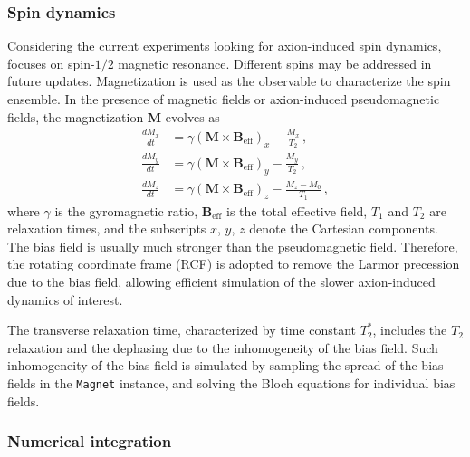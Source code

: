 \documentclass[universe,article,submit,oneauthor]{Definitions/mdpi}
\begin{document}
\subsubsection{Spin dynamics}
\label{sec:spindynamics}

Considering the current experiments looking for axion-induced spin dynamics, \axionbloch{} focuses on spin-$1/2$ magnetic resonance. 
Different spins may be addressed in future updates. 
Magnetization is used as the observable to characterize the spin ensemble. 
In the presence of magnetic fields or axion-induced pseudomagnetic fields, the magnetization $\mathbf{M}$ evolves as
\begin{align}
\frac{d M_x}{dt} &= \gamma \left( \mathbf{M} \times \mathbf{B}_{\mathrm{eff}} \right)_x - \frac{M_x}{T_2}\,,\label{eq:bloch_x} \\
\frac{d M_y}{dt} &= \gamma \left( \mathbf{M} \times \mathbf{B}_{\mathrm{eff}} \right)_y - \frac{M_y}{T_2}\,,\label{eq:bloch_y} \\
\frac{d M_z}{dt} &= \gamma \left( \mathbf{M} \times \mathbf{B}_{\mathrm{eff}} \right)_z - \frac{M_z - M_0}{T_1}\,,\label{eq:bloch_z}
\end{align}
where $\gamma$ is the gyromagnetic ratio, $\mathbf{B}_{\mathrm{eff}}$ is the total effective field, $T_1$ and $T_2$ are relaxation times, and the subscripts $x$, $y$, $z$ denote the Cartesian components. 
The bias field is usually much stronger than the pseudomagnetic field. 
Therefore, the rotating coordinate frame (RCF) is adopted to remove the Larmor precession due to the bias field, allowing efficient simulation of the slower axion-induced dynamics of interest. 

The transverse relaxation time, characterized by time constant $T_2^*$, includes the $T_2$ relaxation and the dephasing due to the inhomogeneity of the bias field. 
Such inhomogeneity of the bias field is simulated by sampling the spread of the bias fields in the \texttt{Magnet} instance, and solving the Bloch equations for individual bias fields. 

\subsubsection{Numerical integration}
\label{sec:numericalintegration}
\end{document}
